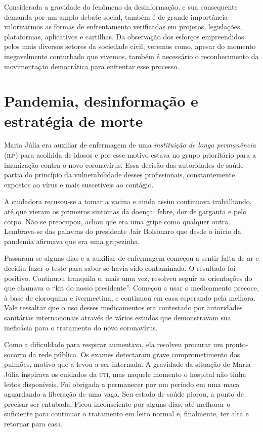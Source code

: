 Considerada a gravidade do fenômeno da desinformação,
e sua consequente demanda por um amplo debate social, também é de grande importância 
valorizarmos as formas de enfrentamento verificadas em projetos, legislações,
plataformas, aplicativos e cartilhas. Da observação dos esforços
empreendidos pelos mais diversos setores da sociedade civil, veremos
como, apesar do momento inegavelmente conturbado que vivemos, também é
necessário o reconhecimento da movimentação democrática para enfrentar esse
processo.


\chapter[Pandemia, desinformação e estratégia de morte]{Pandemia, desinformação e\\estratégia de morte}

Maria Júlia era auxiliar de enfermagem de uma \textit{instituição de longa
permanência} (\textsc{ilp}) para acolhida de idosos e por esse motivo estava no
grupo prioritário para a imunização contra o novo coronavírus. Essa
decisão das autoridades de saúde partia do princípio da vulnerabilidade
desses profissionais, constantemente expostos ao vírus e mais
suscetíveis ao contágio.

A cuidadora recusou-se a tomar a vacina e ainda assim continuava
trabalhando, até que vieram os primeiros sintomas da doença:
febre, dor de garganta e pelo corpo. Não se preocupou,
achou que era uma gripe como qualquer outra. Lembrava-se das palavras do
presidente Jair Bolsonaro que desde o início da pandemia afirmava que
era uma gripezinha.

Passaram-se alguns dias e a auxiliar de enfermagem começou a sentir
falta de ar e decidiu fazer o teste para saber se havia sido
contaminada. O resultado foi positivo. Continuou tranquila e, mais uma
vez, resolveu seguir as orientações do que chamava o ``kit do nosso
presidente''. Começou a usar o medicamento precoce, à base de cloroquina
e ivermectina, e continuou em casa esperando pela melhora. Vale
ressaltar que o uso desses medicamentos era contestado por autoridades
sanitárias internacionais através de vários estudos que demonstravam sua
ineficácia para o tratamento do novo coronavírus.

Como a dificuldade para respirar aumentava, ela resolveu procurar um
pronto-socorro da rede pública. Os exames detectaram grave
comprometimento dos pulmões, motivo que a levou a ser internada. A
gravidade da situação de Maria Júlia inspirava os cuidados da \textsc{uti}, mas naquele momento o hospital não tinha leitos
disponíveis. Foi obrigada a permanecer por um período em uma maca
aguardando a liberação de uma vaga. Seu estado de saúde piorou, a ponto
de precisar ser entubada. Ficou inconsciente por alguns dias, até
melhorar o suficiente para continuar o tratamento em leito normal e,
finalmente, ter alta e retornar para casa.

